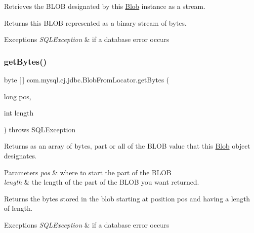 Retrieves the B\+L\+OB designated by this \mbox{\hyperlink{classcom_1_1mysql_1_1cj_1_1jdbc_1_1_blob}{Blob}} instance as a stream.

\begin{DoxyReturn}{Returns}
this B\+L\+OB represented as a binary stream of bytes.
\end{DoxyReturn}

\begin{DoxyExceptions}{Exceptions}
{\em S\+Q\+L\+Exception} & if a database error occurs \\
\hline
\end{DoxyExceptions}
\mbox{\label{classcom_1_1mysql_1_1cj_1_1jdbc_1_1_blob_from_locator_ac9d460d4f9f59946014b373d7d703564}} 
\subsubsection{\texorpdfstring{get\+Bytes()}{getBytes()}}
{\footnotesize\ttfamily byte \mbox{[}$\,$\mbox{]} com.\+mysql.\+cj.\+jdbc.\+Blob\+From\+Locator.\+get\+Bytes (\begin{DoxyParamCaption}\item[{long}]{pos,  }\item[{int}]{length }\end{DoxyParamCaption}) throws S\+Q\+L\+Exception}

Returns as an array of bytes, part or all of the B\+L\+OB value that this \mbox{\hyperlink{classcom_1_1mysql_1_1cj_1_1jdbc_1_1_blob}{Blob}} object designates.


\begin{DoxyParams}{Parameters}
{\em pos} & where to start the part of the B\+L\+OB \\
\hline
{\em length} & the length of the part of the B\+L\+OB you want returned.\\
\hline
\end{DoxyParams}
\begin{DoxyReturn}{Returns}
the bytes stored in the blob starting at position {\ttfamily pos} and having a length of {\ttfamily length}.
\end{DoxyReturn}

\begin{DoxyExceptions}{Exceptions}
{\em S\+Q\+L\+Exception} & if a database error occurs \\
\hline
\end{DoxyExceptions}
\mbox{\label{classcom_1_1mysql_1_1cj_1_1jdbc_1_1_blob_from_locator_a6eea7dd5b29ebcd066beac855648fe35}} 
